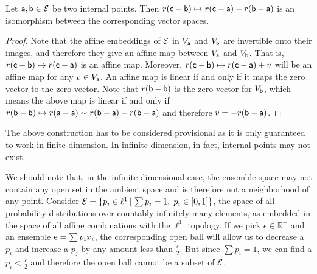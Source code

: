\begin{mathSection}
	\begin{prop}
		Let $\ens[a],\ens[b] \in \Ens$ be two internal points. Then $r(\ens[c] - \ens[b]) \mapsto r(\ens[c]-\ens[a]) - r(\ens[b]-\ens[a])$ is an isomorphism between the corresponding vector spaces.
	\end{prop}
	
	\begin{proof}
		Note that the affine embeddings of $\Ens$ in $V_{\ens[a]}$ and $V_{\ens[b]}$ are invertible onto their images, and therefore they give an affine map between $V_{\ens[a]}$ and $V_{\ens[b]}$. That is, $r(\ens[c] - \ens[b]) \mapsto r(\ens[c]-\ens[a])$ is an affine map. Moreover, $r(\ens[c] - \ens[b]) \mapsto r(\ens[c]-\ens[a]) + v$ will be an affine map for any $v \in V_{\ens[a]}$. An affine map is linear if and only if it maps the zero vector to the zero vector. Note that $r(\ens[b] - \ens[b])$ is the zero vector for $V_{\ens[b]}$, which means the above map is linear if and only if $r(\ens[b] - \ens[b]) \mapsto r(\ens[a] - \ens[a]) \sim r(\ens[b]-\ens[a]) - r (\ens[b]-\ens[a])$ and therefore $v = -r(\ens[b]-\ens[a])$.
	\end{proof}
\end{mathSection}

The above construction has to be considered provisional as it is only guaranteed to work in finite dimension. In infinite dimension, in fact, internal points may not exist.

\begin{mathSection}
	\begin{remark}
We should note that, in the infinite-dimensional case, the ensemble space may not contain any open set in the ambient space and is therefore not a neighborhood of any point. Consider $\Ens = \{ p_i \in \ell^1 \, | \,  \sum p_ i =1, \; p_i \in [0,1]\}$, the space of all probability distributions over countably infinitely many elements, as embedded in the space of all affine combinations with the $\ell^1$ topology. If we pick $\epsilon \in \mathbb{R}^+$ and an ensemble $\ens = \sum p_i x_i$, the corresponding open ball will allow us to decrease a $p_i$ and increase a $p_j$ by any amount less than $\frac{\epsilon}{2}$. But since $\sum p_i = 1$, we can find a $p_i < \frac{\epsilon}{2}$ and therefore the open ball cannot be a subset of $\Ens$.
	\end{remark}
\end{mathSection}



